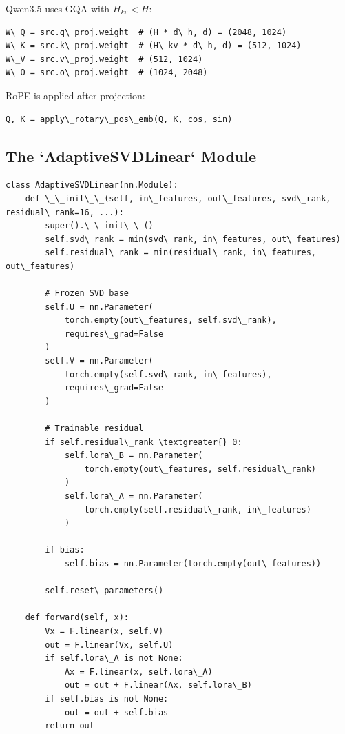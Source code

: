 Qwen3.5 uses GQA with $H_{kv} < H$:

\begin{lstlisting}
W\_Q = src.q\_proj.weight  # (H * d\_h, d) = (2048, 1024)
W\_K = src.k\_proj.weight  # (H\_kv * d\_h, d) = (512, 1024)
W\_V = src.v\_proj.weight  # (512, 1024)
W\_O = src.o\_proj.weight  # (1024, 2048)
\end{lstlisting}

RoPE is applied after projection:

\begin{lstlisting}
Q, K = apply\_rotary\_pos\_emb(Q, K, cos, sin)
\end{lstlisting}

\subsection{The `AdaptiveSVDLinear` Module}

\begin{lstlisting}
class AdaptiveSVDLinear(nn.Module):
    def \_\_init\_\_(self, in\_features, out\_features, svd\_rank, residual\_rank=16, ...):
        super().\_\_init\_\_()
        self.svd\_rank = min(svd\_rank, in\_features, out\_features)
        self.residual\_rank = min(residual\_rank, in\_features, out\_features)
        
        # Frozen SVD base
        self.U = nn.Parameter(
            torch.empty(out\_features, self.svd\_rank),
            requires\_grad=False
        )
        self.V = nn.Parameter(
            torch.empty(self.svd\_rank, in\_features),
            requires\_grad=False
        )
        
        # Trainable residual
        if self.residual\_rank \textgreater{} 0:
            self.lora\_B = nn.Parameter(
                torch.empty(out\_features, self.residual\_rank)
            )
            self.lora\_A = nn.Parameter(
                torch.empty(self.residual\_rank, in\_features)
            )
        
        if bias:
            self.bias = nn.Parameter(torch.empty(out\_features))
        
        self.reset\_parameters()
    
    def forward(self, x):
        Vx = F.linear(x, self.V)
        out = F.linear(Vx, self.U)
        if self.lora\_A is not None:
            Ax = F.linear(x, self.lora\_A)
            out = out + F.linear(Ax, self.lora\_B)
        if self.bias is not None:
            out = out + self.bias
        return out
\end{lstlisting}

